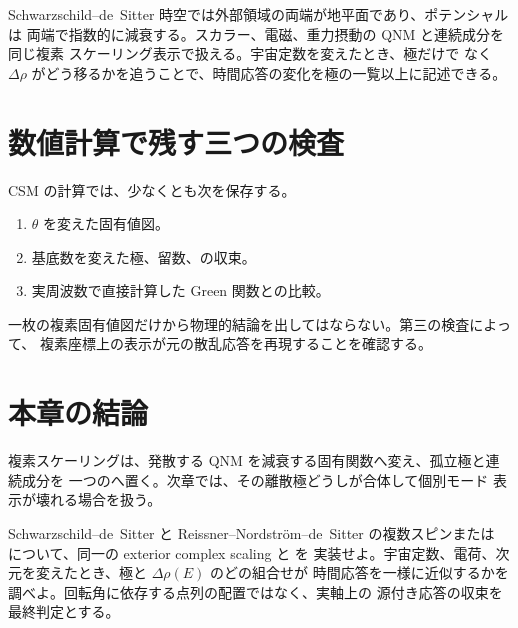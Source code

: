 Schwarzschild--de~Sitter 時空では外部領域の両端が地平面であり、ポテンシャルは
両端で指数的に減衰する。スカラー、電磁、重力摂動の QNM と連続成分を同じ複素
スケーリング表示で扱える\cite{Ogawa:2026dSCSM}。宇宙定数を変えたとき、極だけで
なく $\Delta\rho$ がどう移るかを追うことで、時間応答の変化を極の一覧以上に記述できる。

\section{数値計算で残す三つの検査}

CSM の計算では、少なくとも次を保存する。

\begin{enumerate}[label=(\roman*),leftmargin=2.8em]
\item {} $\theta$ を変えた固有値図。
\item 基底数を変えた極、留数、の収束。
\item 実周波数で直接計算した Green 関数との比較。
\end{enumerate}

一枚の複素固有値図だけから物理的結論を出してはならない。第三の検査によって、
複素座標上の表示が元の散乱応答を再現することを確認する。

\section{本章の結論}

複素スケーリングは、発散する QNM を減衰する固有関数へ変え、孤立極と連続成分を
一つのへ置く。次章では、その離散極どうしが合体して個別モード
表示が壊れる場合を扱う。

\begin{researchproblem}
Schwarzschild--de~Sitter と Reissner--Nordstr\"om--de~Sitter の複数スピンまたは
について、同一の exterior complex scaling と  を
実装せよ。宇宙定数、電荷、次元を変えたとき、極と $\Delta\rho(E)$ のどの組合せが
時間応答を一様に近似するかを調べよ。回転角に依存する点列の配置ではなく、実軸上の
源付き応答の収束を最終判定とする。
\end{researchproblem}
